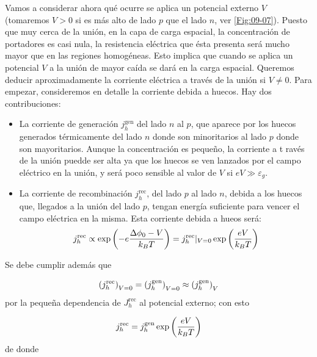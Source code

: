 Vamos a considerar ahora qué ocurre se aplica un potencial externo $V$ (tomaremos $V>0$ si es más alto de lado $p$ que el lado $n$, ver \ref{Fig:09-07}). Puesto que muy cerca de la unión, en la capa de carga espacial, la concentración de portadores es casi nula, la resistencia eléctrica que ésta presenta será mucho mayor que en las regiones homogéneas. Esto implica que cuando se aplica un potencial $V$ a la unión de mayor caída se dará en la carga espacial. Queremos deducir aproximadamente la corriente eléctrica a través de la unión si $V\neq 0$. Para empezar, consideremos en detalle la corriente debida a huecos. Hay dos contribuciones:

\begin{itemize}
	\item La corriente de generación $j_h^{\text{gen}}$ del lado $n$ al $p$, que aparece por los huecos generados térmicamente del lado $n$ donde son minoritarios al lado $p$ donde son mayoritarios. Aunque la concentración es pequeño, la corriente a t ravés de la unión puedde ser alta ya que los huecos se ven lanzados por el campo eléctrico en la unión, y será poco sensible al valor de $V$ si $eV\gg \varepsilon_g$.
	\item La corriente de recombinación $j_h^{\text{rec}}$, del lado $p$ al lado $n$, debida a los huecos que, llegados a la unión del lado $p$, tengan energía suficiente para vencer el campo eléctrica en la misma. Esta corriente debida a hueos será:
	\begin{equation}
		j_h^{\text{rec}} \propto \exp \left( -e\frac{\Delta \phi_0-V}{k_BT} \right) = j_h^{\text{rec}}|_{V=0} \exp \left( \frac{eV}{k_BT} \right)
	\end{equation}
\end{itemize}
Se debe cumplir además que

\begin{equation}
	\left( j_h^{\text{rec}} \right)_{V=0} = \left( j_h^{\text{gen}} \right)_{V=0} \approx\left( j_h^{\text{gen}} \right)_V
\end{equation}
por la pequeña dependencia de $J_h^{\text{rec}}$ al potencial externo; con esto

\begin{equation}
	j_h^{\text{rec}} = j_h^{\text{gen}} \exp \left( \frac{eV}{k_BT} \right)
\end{equation}
de donde 

